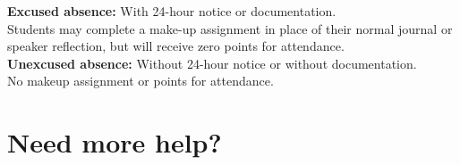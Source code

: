 \documentclass[12pt]{article}
\begin{document}
\textbf{Excused absence:} With 24-hour notice or documentation.\\
Students may complete a make-up assignment in place of their normal journal or speaker reflection, but will receive zero points for attendance.\\

\textbf{Unexcused absence:} Without 24-hour notice or without documentation.\\
No makeup assignment or points for attendance.

\section{Need more help?}
\end{document}
